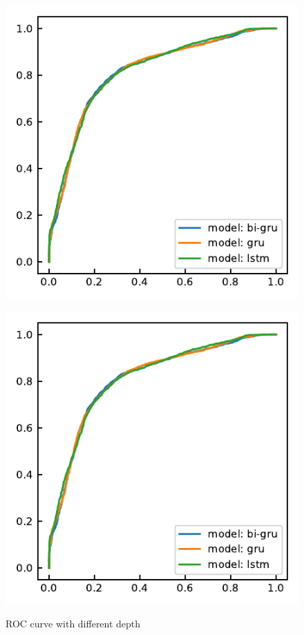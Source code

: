 \begin{figure}[H]
\begin{minipage}[b]{0.3\columnwidth}
		\includegraphics[clip, width=\linewidth]{fig/chapter4/3d/roc/depth_50.pdf}
		\label{fig:}
	\end{minipage}
	\begin{minipage}[b]{0.3\columnwidth}
		\centering
		\includegraphics[clip, width=\linewidth]{fig/chapter4/3d/roc/depth_100.pdf}
		\label{fig:}
	\end{minipage}
	
	\caption{ROC curve with different depth}
	\label{fig:2dcnn+LSTM_roc}
	
\end{figure}

